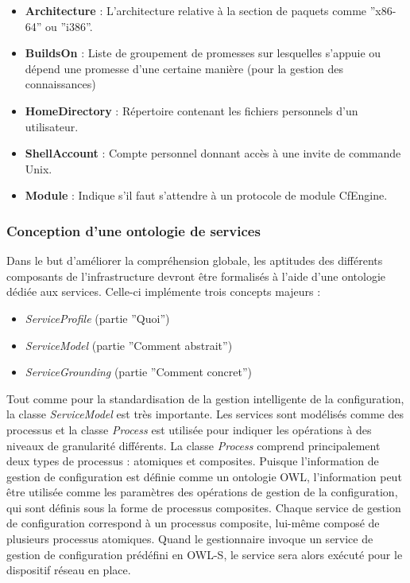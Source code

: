\begin{itemize}
  \item \textbf{Architecture} : L'architecture relative à la section de paquets
	  comme ''x86-64'' ou ''i386''.
  \item \textbf{BuildsOn} : Liste de groupement de promesses sur lesquelles
	  s'appuie ou dépend une promesse d'une certaine manière (pour la
	  gestion des connaissances)
  \item \textbf{HomeDirectory} : Répertoire contenant les fichiers personnels
	  d'un utilisateur.
  \item \textbf{ShellAccount} : Compte personnel donnant accès à une invite de
	  commande Unix.
  \item \textbf{Module} : Indique s'il faut s'attendre à un protocole de module
	  CfEngine.
\end{itemize}

\subsubsection{Conception d'une ontologie de services}

Dans le but d'améliorer la compréhension globale, les aptitudes des différents
composants de l'infrastructure devront être formalisés à l'aide d'une ontologie
dédiée aux services. Celle-ci implémente trois concepts majeurs :

\begin{itemize}
    \item \emph{ServiceProfile} (partie ''Quoi'')
    \item \emph{ServiceModel} (partie ''Comment abstrait'')
    \item \emph{ServiceGrounding} (partie ''Comment concret'')
\end{itemize}

Tout comme pour la standardisation de la gestion intelligente de la
configuration, la classe \emph{ServiceModel} est très importante. Les services
sont modélisés comme des processus et la classe \emph{Process} est utilisée pour
indiquer les opérations à des niveaux de granularité différents. La classe
\emph{Process} comprend principalement deux types de processus : atomiques et
composites. Puisque l'information de gestion de configuration est définie comme
un ontologie OWL, l'information peut être utilisée comme les paramètres des
opérations de gestion de la configuration, qui sont définis sous la forme de
processus composites.  Chaque service de gestion de configuration correspond à
un processus composite, lui-même composé de plusieurs processus atomiques. Quand
le gestionnaire invoque un service de gestion de configuration prédéfini en
OWL-S, le service sera alors exécuté pour le dispositif réseau en place.

